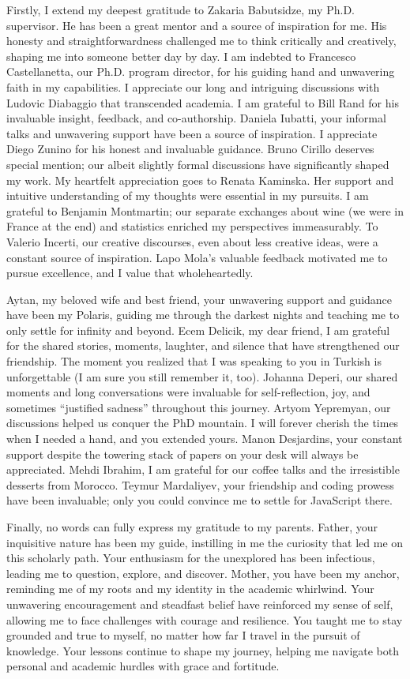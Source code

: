 \documentclass[a4paper,12pt]{article}
\begin{document}
Firstly, I extend my deepest gratitude to Zakaria Babutsidze, my Ph.D. supervisor. He has been a great mentor and a source of inspiration for me. His honesty and straightforwardness challenged me to think critically and creatively, shaping me into someone better day by day. I am indebted to Francesco Castellanetta, our Ph.D. program director, for his guiding hand and unwavering faith in my capabilities. I appreciate our long and intriguing discussions with Ludovic Diabaggio that transcended academia. I am grateful to Bill Rand for his invaluable insight, feedback, and co-authorship. Daniela Iubatti, your informal talks and unwavering support have been a source of inspiration. I appreciate Diego Zunino for his honest and invaluable guidance. Bruno Cirillo deserves special mention; our albeit slightly formal discussions have significantly shaped my work. My heartfelt appreciation goes to Renata Kaminska. Her support and intuitive understanding of my thoughts were essential in my pursuits. I am grateful to Benjamin Montmartin; our separate exchanges about wine (we were in France at the end) and statistics enriched my perspectives immeasurably. To Valerio Incerti, our creative discourses, even about less creative ideas, were a constant source of inspiration. Lapo Mola's valuable feedback motivated me to pursue excellence, and I value that wholeheartedly.

Aytan, my beloved wife and best friend, your unwavering support and guidance have been my Polaris, guiding me through the darkest nights and teaching me to only settle for infinity and beyond. Ecem Delicik, my dear friend, I am grateful for the shared stories, moments, laughter, and silence that have strengthened our friendship. The moment you realized that I was speaking to you in Turkish is unforgettable (I am sure you still remember it, too). Johanna Deperi, our shared moments and long conversations were invaluable for self-reflection, joy, and sometimes ``justified sadness'' throughout this journey. Artyom Yepremyan, our discussions helped us conquer the PhD mountain. I will forever cherish the times when I needed a hand, and you extended yours. Manon Desjardins, your constant support despite the towering stack of papers on your desk will always be appreciated. Mehdi Ibrahim, I am grateful for our coffee talks and the irresistible desserts from Morocco. Teymur Mardaliyev, your friendship and coding prowess have been invaluable; only you could convince me to settle for JavaScript there.

Finally, no words can fully express my gratitude to my parents. Father, your inquisitive nature has been my guide, instilling in me the curiosity that led me on this scholarly path. Your enthusiasm for the unexplored has been infectious, leading me to question, explore, and discover. Mother, you have been my anchor, reminding me of my roots and my identity in the academic whirlwind. Your unwavering encouragement and steadfast belief have reinforced my sense of self, allowing me to face challenges with courage and resilience. You taught me to stay grounded and true to myself, no matter how far I travel in the pursuit of knowledge. Your lessons continue to shape my journey, helping me navigate both personal and academic hurdles with grace and fortitude. 
\end{document}
